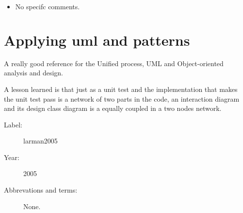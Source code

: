 \begin{itemize}
    \item No specifc comments.
\end{itemize}

\section{Applying uml and patterns}

A really good reference for the Unified process, UML and Object-oriented
analysis and design.

A lesson learned is that just as a unit test and the implementation that makes
the unit test pass is a network of two parts in the code, an interaction
diagram and its design class diagram is a equally coupled in a two nodes
network.

\begin{description}
    \item[Label:] larman2005 \cite{larman2005}
    \item[Year:] 2005
    \item[Abbrevations and terms:] None.
\end{description}

